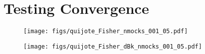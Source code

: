 \documentclass[12pt, letterpaper, preprint]{aastex62}
\begin{document}
\section{Testing Convergence} 

\begin{figure}
\begin{center}
    \texttt{[image: figs/quijote\_Fisher\_nmocks\_001\_05.pdf]}
    \caption{}
\label{fig:cov_converge}
\end{center}
\end{figure}

\begin{figure}
\begin{center}
    \texttt{[image: figs/quijote\_Fisher\_dBk\_nmocks\_001\_05.pdf]} 
    \caption{}
\label{fig:dbk_converge}
\end{center}
\end{figure}

%
\end{document}
